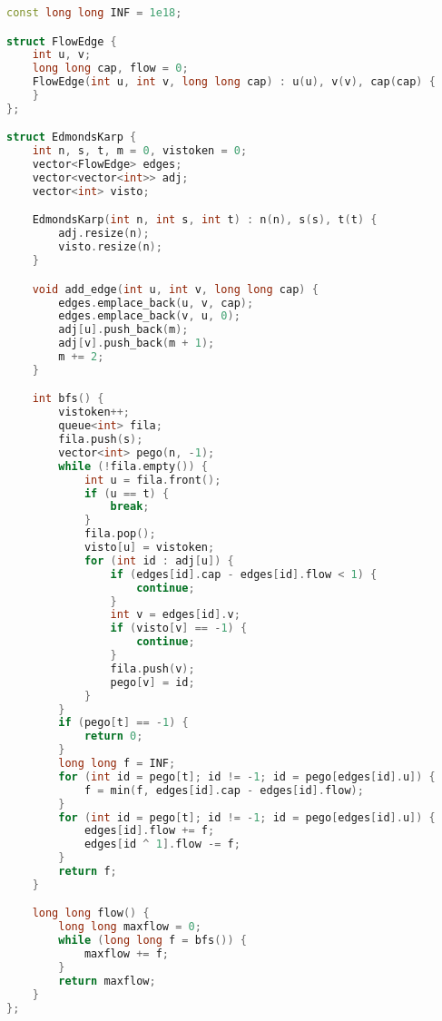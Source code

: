 \documentclass[11pt, a4paper, oneside]{book}
\begin{document}
\begin{multicols}{2}
\begin{lstlisting}[language=C++]
const long long INF = 1e18;

struct FlowEdge {
    int u, v;
    long long cap, flow = 0;
    FlowEdge(int u, int v, long long cap) : u(u), v(v), cap(cap) {
    }
};

struct EdmondsKarp {
    int n, s, t, m = 0, vistoken = 0;
    vector<FlowEdge> edges;
    vector<vector<int>> adj;
    vector<int> visto;

    EdmondsKarp(int n, int s, int t) : n(n), s(s), t(t) {
        adj.resize(n);
        visto.resize(n);
    }

    void add_edge(int u, int v, long long cap) {
        edges.emplace_back(u, v, cap);
        edges.emplace_back(v, u, 0);
        adj[u].push_back(m);
        adj[v].push_back(m + 1);
        m += 2;
    }

    int bfs() {
        vistoken++;
        queue<int> fila;
        fila.push(s);
        vector<int> pego(n, -1);
        while (!fila.empty()) {
            int u = fila.front();
            if (u == t) {
                break;
            }
            fila.pop();
            visto[u] = vistoken;
            for (int id : adj[u]) {
                if (edges[id].cap - edges[id].flow < 1) {
                    continue;
                }
                int v = edges[id].v;
                if (visto[v] == -1) {
                    continue;
                }
                fila.push(v);
                pego[v] = id;
            }
        }
        if (pego[t] == -1) {
            return 0;
        }
        long long f = INF;
        for (int id = pego[t]; id != -1; id = pego[edges[id].u]) {
            f = min(f, edges[id].cap - edges[id].flow);
        }
        for (int id = pego[t]; id != -1; id = pego[edges[id].u]) {
            edges[id].flow += f;
            edges[id ^ 1].flow -= f;
        }
        return f;
    }

    long long flow() {
        long long maxflow = 0;
        while (long long f = bfs()) {
            maxflow += f;
        }
        return maxflow;
    }
};
\end{lstlisting}
\end{multicols}

\hfill
\end{document}
